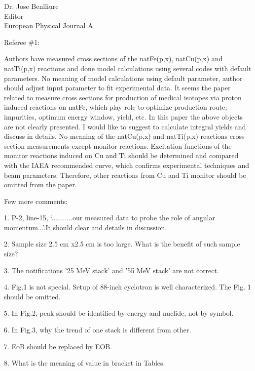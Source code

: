 \documentclass{letter} %
\newcommand{\colornote}[1]{\textcolor{red}{#1}}
\begin{document}
\begin{letter}{Dr. Jose Benlliure \\
Editor \\
European Physical Journal A}

  \vfill
  
 \pagebreak
 
 
 
 Referee \#1:
 
Authors have measured cross sections of the natFe(p,x), natCu(p,x) and natTi(p,x) reactions and done
model calculations using several codes with default parameters. No meaning of model calculations using
default parameter, author should adjust input parameter to fit experimental data.
It seems the paper related to measure cross sections for production of medical isotopes via proton
induced reactions on natFe, which play role to optimize production route; impurities, optimum energy
window, yield, etc. In this paper the above objects are not clearly presented. I would like to suggest to
calculate integral yields and discuss in details.
No meaning of the natCu(p,x) and natTi(p,x) reactions cross section measurements except monitor
reactions. Excitation functions of the monitor reactions induced on Cu and Ti should be determined and
compared with the IAEA recommended curve, which confirms experimental techniques and beam
parameters. Therefore, other reactions from Cu and Ti monitor should be omitted from the paper.




Few more comments:

1. P-2, line-15, ‘...........our measured data to probe the role of angular momentum...’.It should
clear and details in discussion.

2. Sample size 2.5 cm x2.5 cm is too large. What is the benefit of such sample size?

3. The notifications ’25 MeV stack’ and ’55 MeV stack’ are not correct.

4. Fig.1 is not special. Setup of 88-inch cyclotron is well characterized. The Fig. 1 should be
omitted.

5. In Fig.2, peak should be identified by energy and nuclide, not by symbol.

6. In Fig.3, why the trend of one stack is different from other.

7. EoB should be replaced by EOB.

8. What is the meaning of value in bracket in Tables.


\end{letter}
\end{document}
